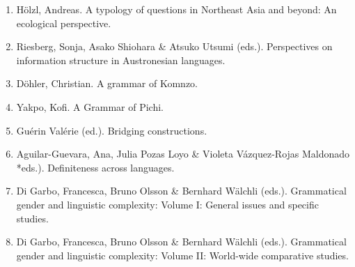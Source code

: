 \begin{enumerate}
\item Hölzl, Andreas. A typology of questions in Northeast Asia and beyond: An ecological perspective.
\item Riesberg, Sonja,  Asako Shiohara \& Atsuko Utsumi (eds.). Perspectives on information structure in Austronesian languages.
\item Döhler, Christian. A grammar of Komnzo.
\item Yakpo, Kofi. A Grammar of Pichi.
\item Guérin Valérie (ed.). Bridging constructions.
\item Aguilar-Guevara, Ana,   Julia Pozas Loyo \&  Violeta Vázquez-Rojas Maldonado *eds.). Definiteness across languages.
\item Di Garbo, Francesca, Bruno Olsson \& Bernhard Wälchli (eds.). Grammatical gender and linguistic complexity: Volume I: General issues and specific studies.
\item Di Garbo, Francesca, Bruno Olsson \& Bernhard Wälchli (eds.). Grammatical gender and linguistic complexity: Volume II: World-wide comparative studies.
\end{enumerate}
  
